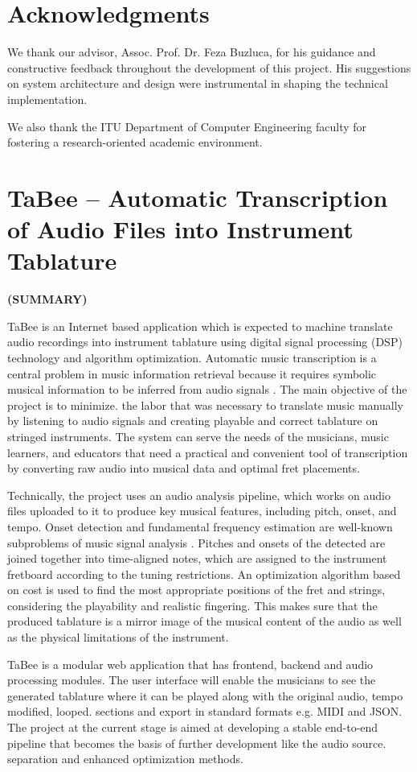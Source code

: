 \documentclass[a4paper, 12pt, titlepage]{article}
\newcommand{\thetitle}{TaBee – Automatic Transcription of Audio Files into Instrument Tablature}
\begin{document}
\newpage
\section*{Acknowledgments}
We thank our advisor, Assoc. Prof. Dr. Feza Buzluca, for his guidance and constructive feedback throughout the development of this project. His suggestions on system architecture and design were instrumental in shaping the technical implementation.

We also thank the ITU Department of Computer Engineering faculty for fostering a research-oriented academic environment.

\newpage
\section*{\centering\thetitle}
\centerline{\fontsize{16pt}{21.6pt}\sffamily\bfseries (SUMMARY)}
TaBee is an Internet based application which is expected to machine translate audio recordings into instrument tablature using digital signal processing (DSP) technology and algorithm optimization. Automatic music transcription is a central problem in music information retrieval because it requires symbolic musical information to be inferred from audio signals \cite{klapuri2004,benetos2013}. The main objective of the project is to minimize.
the labor that was necessary to translate music manually by listening to audio signals and creating playable and correct tablature on stringed instruments. The system can serve the needs of the musicians, music learners, and educators that need a practical and convenient tool of transcription by converting raw audio into musical data and optimal fret placements.

Technically, the project uses an audio analysis pipeline, which works on audio files uploaded to it to produce key musical features, including pitch, onset, and tempo. Onset detection and fundamental frequency estimation are well-known subproblems of music signal analysis \cite{bello2005,mauch2014}. Pitches and onsets of the detected are joined together into time-aligned notes, which are assigned to the instrument fretboard according to the tuning restrictions. An optimization algorithm based on cost is used to find the most appropriate positions of the fret and strings, considering the playability and realistic fingering. This makes sure that the produced tablature is a mirror image of the musical content of the audio as well as the physical limitations of the instrument.

TaBee is a modular web application that has frontend, backend and audio processing modules. The user interface will enable the musicians to see the generated tablature where it can be played along with the original audio, tempo modified, looped.
sections and export in standard formats e.g. MIDI and JSON. The project at the current stage is aimed at developing a stable end-to-end pipeline that becomes the basis of further development like the audio source.
separation and enhanced optimization methods.
\end{document}
